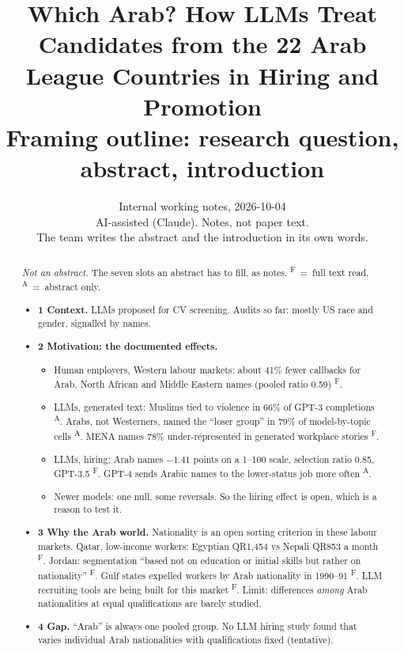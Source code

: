 \documentclass[11pt]{article}
\title{Which Arab? How LLMs Treat Candidates from the 22 Arab League Countries in Hiring and Promotion\\[4pt]
\large Framing outline: research question, abstract, introduction}
\author{
  Internal working notes, 2026-10-04 \\
  AI-assisted (Claude). Notes, not paper text. \\
  The team writes the abstract and the introduction in its own words.
}
\newcommand{\vF}{\textsuperscript{F}} %
\newcommand{\vA}{\textsuperscript{A}} %
\newcommand{\slot}[1]{\textbf{#1}}
\begin{document}
\maketitle

\begin{abstract}
\textit{Not an abstract.} The seven slots an abstract has to fill, as notes.
\vF~=~full text read, \vA~=~abstract only.
\begin{itemize}
\item \slot{1 Context.} LLMs proposed for CV screening. Audits so far: mostly US race and gender, signalled by names.
\item \slot{2 Motivation: the documented effects.}
  \begin{itemize}
  \item Human employers, Western labour markets: about 41\% fewer callbacks for Arab, North African and Middle Eastern names (pooled ratio 0.59) \citep{lippens2023state}\vF.
  \item LLMs, generated text: Muslims tied to violence in 66\% of GPT-3 completions \citep{abid2021persistent}\vA. Arabs, not Westerners, named the ``loser group'' in 79\% of model-by-topic cells \citep{saeed2024desert}\vA. MENA names 78\% under-represented in generated workplace stories \citep{shieh2026intersectional}\vF.
  \item LLMs, hiring: Arab names $-1.41$ points on a 1--100 scale, selection ratio 0.85, GPT-3.5 \citep{lippens2024computer}\vF. GPT-4 sends Arabic names to the lower-status job more often \citep{bai2025explicitly}\vA.
  \item Newer models: one null, some reversals. So the hiring effect is open, which is a reason to test it.
  \end{itemize}
\item \slot{3 Why the Arab world.} Nationality is an open sorting criterion in these labour markets. Qatar, low-income workers: Egyptian QR1,454 vs Nepali QR853 a month \citep{gardner2013portrait}\vF. Jordan: segmentation ``based not on education or initial skills but rather on nationality'' \citep{razzaz2017challenging}\vF. Gulf states expelled workers by Arab nationality in 1990--91 \citep{kapiszewski2006arab}\vF. LLM recruiting tools are being built for this market \citep{albaroudi2026addressing}\vF. Limit: differences \emph{among} Arab nationalities at equal qualifications are barely studied.
\item \slot{4 Gap.} ``Arab'' is always one pooled group. No LLM hiring study found that varies individual Arab nationalities with qualifications fixed (tentative).

\end{itemize}
\end{abstract}
\end{document}
